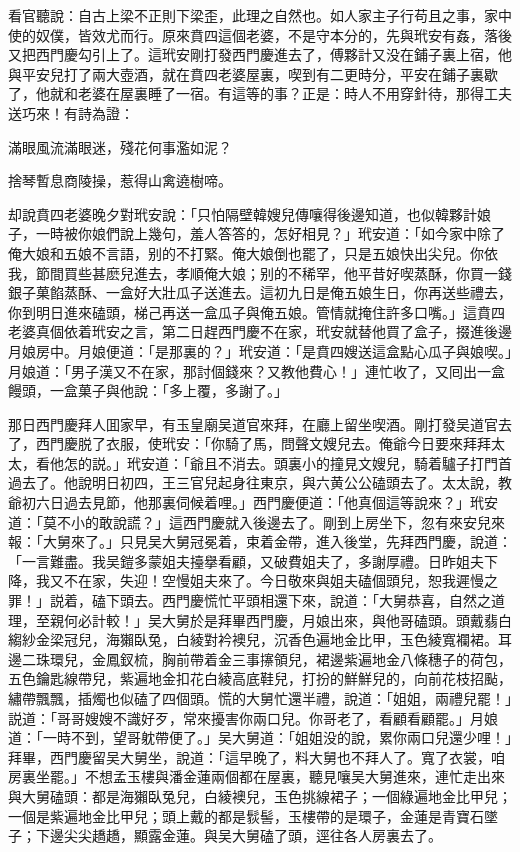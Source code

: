 看官聽說：自古上梁不正則下梁歪，此理之自然也。如人家主子行苟且之事，家中使的奴僕，皆效尤而行。原來賁四這個老婆，不是守本分的，先與玳安有姦，落後又把西門慶勾引上了。這玳安剛打發西門慶進去了，傅夥計又没在鋪子裏上宿，他與平安兒打了兩大壺酒，就在賁四老婆屋裏，喫到有二更時分，平安在鋪子裏歇了，他就和老婆在屋裏睡了一宿。有這等的事？正是：時人不用穿針待，那得工夫送巧來！有詩為證：

滿眼風流滿眼迷，殘花何事濫如泥？

捨琴暫息商陵操，惹得山禽遶樹啼。

却說賁四老婆晚夕對玳安說：「只怕隔壁韓嫂兒傳嚷得後邊知道，也似韓夥計娘子，一時被你娘們說上幾句，羞人答答的，怎好相見？」玳安道：「如今家中除了俺大娘和五娘不言語，别的不打緊。俺大娘倒也罷了，只是五娘快出尖兒。你依我，節間買些甚麽兒進去，孝順俺大娘；别的不稀罕，他平昔好喫蒸酥，你買一錢銀子菓餡蒸酥、一盒好大壯瓜子送進去。這初九日是俺五娘生日，你再送些禮去，你到明日進來磕頭，梯己再送一盒瓜子與俺五娘。管情就掩住許多口嘴。」這賁四老婆真個依着玳安之言，第二日趕西門慶不在家，玳安就替他買了盒子，掇進後邊月娘房中。月娘便道：「是那裏的？」玳安道：「是賁四嫂送這盒點心瓜子與娘喫。」月娘道：「男子漢又不在家，那討個錢來？又教他費心！」連忙收了，又囘出一盒饅頭，一盒菓子與他說：「多上覆，多謝了。」

那日西門慶拜人囬家早，有玉皇廟吴道官來拜，在廳上留坐喫酒。剛打發吴道官去了，西門慶脱了衣服，使玳安：「你騎了馬，問聲文嫂兒去。俺爺今日要來拜拜太太，看他怎的説。」玳安道：「爺且不消去。頭裏小的撞見文嫂兒，騎着驢子打門首過去了。他說明日初四，王三官兒起身往東京，與六黄公公磕頭去了。太太說，教爺初六日過去見節，他那裏伺候着哩。」西門慶便道：「他真個這等說來？」玳安道：「莫不小的敢說謊？」這西門慶就入後邊去了。剛到上房坐下，忽有來安兒來報：「大舅來了。」只見吴大舅冠冕着，束着金帶，進入後堂，先拜西門慶，說道：「一言難盡。我吴鎧多蒙姐夫擡擧看顧，又破費姐夫了，多謝厚禮。日昨姐夫下降，我又不在家，失迎！空慢姐夫來了。今日敬來與姐夫磕個頭兒，恕我遲慢之罪！」説着，磕下頭去。西門慶慌忙平頭相還下來，說道：「大舅恭喜，自然之道理，至親何必計較！」吴大舅於是拜畢西門慶，月娘出來，與他哥磕頭。頭戴翡白縐紗金梁冠兒，海獺臥兔，白綾對衿襖兒，沉香色遍地金比甲，玉色綾寬襴裙。耳邊二珠環兒，金鳳釵梳，胸前帶着金三事㩟領兒，裙邊紫遍地金八條穗子的荷包，五色鑰匙線帶兒，紫遍地金扣花白綾高底鞋兒，打扮的鮮鮮兒的，向前花枝招颭，繡帶飄飄，插燭也似磕了四個頭。慌的大舅忙還半禮，說道：「姐姐，兩禮兒罷！」説道：「哥哥嫂嫂不識好歹，常來擾害你兩口兒。你哥老了，看顧看顧罷。」月娘道：「一時不到，望哥躭帶便了。」吴大舅道：「姐姐没的說，累你兩口兒還少哩！」拜畢，西門慶留吴大舅坐，說道：「這早晚了，料大舅也不拜人了。寬了衣裳，咱房裏坐罷。」不想孟玉樓與潘金蓮兩個都在屋裏，聽見嚷吴大舅進來，連忙走出來與大舅磕頭：都是海獺臥兔兒，白綾襖兒，玉色挑線裙子；一個綠遍地金比甲兒；一個是紫遍地金比甲兒；頭上戴的都是䯼髻，玉樓帶的是環子，金蓮是青寶石墜子；下邊尖尖趫趫，顯露金蓮。與吴大舅磕了頭，逕往各人房裏去了。

